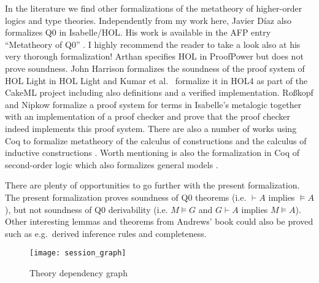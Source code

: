 \documentclass[10pt,a4paper]{article}
\begin{document}
In the literature we find other formalizations of the metatheory of higher-order logics and type theories.
Independently from my work here, Javier Díaz also formalizes Q0 in Isabelle/HOL.
His work is available in the AFP entry ``Metatheory of Q0'' \cite{Q0_Metatheory-AFP}. 
I highly recommend the reader to take a look also at his very thorough formalization!
Arthan specifies HOL \cite{arthan1993,arthan1991sem,arthan1991ded} in ProofPower but does not prove soundness.
John Harrison formalizes the soundness of the proof system of HOL Light \cite{DBLP:conf/cade/Harrison06} in HOL Light
and Kumar et al.\ \cite{DBLP:conf/itp/KumarAMO14,DBLP:journals/jar/KumarAMO16,DBLP:conf/itp/AbrahamssonMKS22,DBLP:conf/itp/AbrahamssonM23} formalize 
it in HOL4 as part of the CakeML project including also definitions and a verified implementation.
Ro{\ss}kopf and Nipkow \cite{DBLP:conf/cade/NipkowR21,Metalogic_ProofChecker-AFP,DBLP:journals/jar/RosskopfN23}
formalize a proof system for terms in Isabelle's metalogic together with an implementation of a 
proof checker and prove that the proof checker indeed implements this proof system.
There are also a number of works using Coq to formalize metatheory of the calculus of constructions and
the calculus of inductive constructions \cite{DBLP:conf/types/Barras96,barras:inria-00073667,coqincoqmanuscript,coqincoqcontribs,DBLP:journals/pacmpl/SozeauBFTW20}.
Worth mentioning is also the formalization in Coq of second-order logic which also formalizes general models \cite{DBLP:conf/cpp/KochK22}.

There are plenty of opportunities to go further with the present formalization.
The present formalization proves soundness of Q0 theorems (i.e. $\vdash A$ implies $\models A$), but not 
soundness of Q0 derivability (i.e. $M \models G$ and $G \vdash A$ implies $M \models A$).
Other interesting lemmas and theorems from Andrews' book could also be proved such as e.g.\ derived inference rules and completeness.

\begin{figure}
\begin{center}
  \texttt{[image: session\_graph]}
\end{center}
\caption{Theory dependency graph}
\label{fig:thys}
\end{figure}

\newpage





\end{document}
